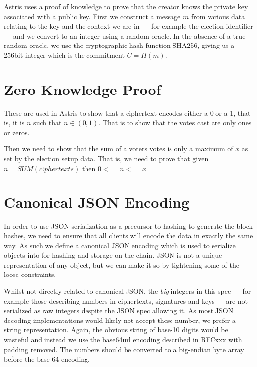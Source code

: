Astris uses a proof of knowledge to prove that the creator knows the private key associated with a public key.
First we construct a message $m$ from various data relating to the key and the context we are in --- for example the election identifier --- and we convert to an integer using a random oracle. In the absence of a true random oracle, we use the cryptographic hash function SHA256, giving us a 256bit integer which is the commitment $C = H(m)$.


\section*{Zero Knowledge Proof}
\label{proc:zkp}

These are used in Astris to show that a ciphertext encodes either a 0 or a 1, that is, it is $n$ such that $n \in (0,1)$.
That is to show that the votes cast are only ones or zeros.

Then we need to show that the sum of a voters votes is only a maximum of $x$ as set by the election setup data. That is, we need to prove that given $n = SUM(ciphertexts)$ then $0 <= n <= x$



\section*{Canonical JSON Encoding}
\label{proc:json}

In order to use JSON serialization as a precursor to hashing to generate the block hashes, we need to ensure that all clients will encode the data in exactly the same way. As such we define a canonical JSON encoding which is used to serialize objects into for hashing and storage on the chain. JSON is not a unique representation of any object, but we can make it so by tightening some of the loose constraints.

Whilst not directly related to canonical JSON, the \emph{big} integers in this spec --- for example those describing numbers in ciphertexts, signatures and keys --- are not serialized as raw integers despite the JSON spec allowing it. As most JSON decoding implementations would likely not accept these number, we prefer a string representation. Again, the obvious string of base-10 digits would be wasteful and instead we use the base64url encoding described in RFCxxx with padding removed. The numbers should be converted to a big-endian byte array before the base-64 encoding.

